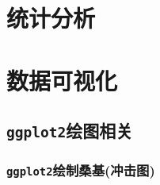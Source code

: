 \documentclass[
  10pt,
]{book}
\begin{document}
\hypertarget{r-stat}{%
\chapter{统计分析}\label{r-stat}}

\hypertarget{r-vis}{%
\chapter{数据可视化}\label{r-vis}}

\hypertarget{ggplot2ux7ed8ux56feux76f8ux5173}{%
\section{\texorpdfstring{\texttt{ggplot2}绘图相关}{ggplot2绘图相关}}\label{ggplot2ux7ed8ux56feux76f8ux5173}}

\hypertarget{ggplot2ux7ed8ux5236ux6851ux57faux51b2ux51fbux56fe}{%
\subsection{\texorpdfstring{\texttt{ggplot2}绘制桑基(冲击图)}{ggplot2绘制桑基(冲击图)}}\label{ggplot2ux7ed8ux5236ux6851ux57faux51b2ux51fbux56fe}}
\end{document}
